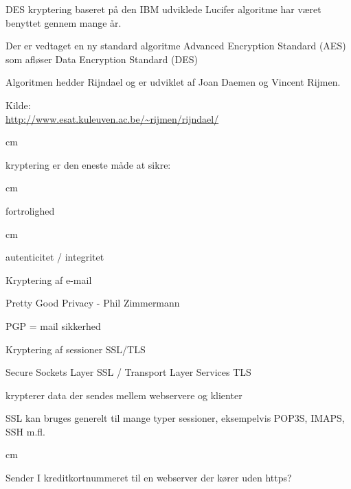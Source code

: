 

\begin{list1}
\item DES kryptering baseret på den IBM udviklede Lucifer algoritme
  har været benyttet gennem mange år. 
\item Der er vedtaget en ny standard algoritme Advanced Encryption
  Standard (AES) som afløser Data Encryption Standard (DES)
\item Algoritmen hedder Rijndael og er udviklet
af Joan Daemen og Vincent Rijmen.

\item Kilde:
\\
\href{http://www.esat.kuleuven.ac.be/~rijmen/rijndael/}
{http://www.esat.kuleuven.ac.be/\~{}rijmen/rijndael/}
\end{list1}



 cm
\centerline{\hlkbig kryptering er den eneste måde at sikre:}
 cm
\centerline{\hlkbig fortrolighed}
 cm
\centerline{\hlkbig autenticitet / integritet}



\begin{list1}
\item Kryptering af e-mail
\begin{list2}
\item Pretty Good Privacy - Phil Zimmermann
\item PGP = mail sikkerhed
\end{list2}
\item Kryptering af sessioner SSL/TLS
\begin{list2}
\item Secure Sockets Layer SSL / Transport Layer Services TLS
\item krypterer data der sendes mellem webservere og klienter
\item SSL kan bruges generelt til mange typer sessioner, eksempelvis
  POP3S, IMAPS, SSH m.fl.
\end{list2}
 cm 
\item Sender I kreditkortnummeret til en webserver der kører uden https?
\end{list1}

